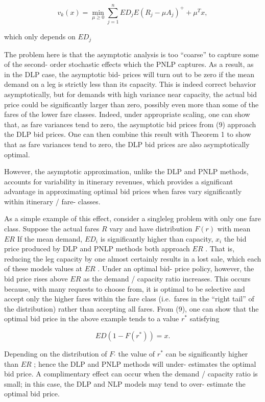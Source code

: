 \[
v_{k}(x) = \min_{\mu \geq 0}\sum_{j = 1}^{n}ED_{j}E(R_{j} - \mu A_{j})^{+} + \mu^{T}x,
\]

which only depends on \(ED_{j}\)

The problem here is that the asymptotic analysis is too ``coarse'' to
capture some of the second- order stochastic effects which the PNLP
captures. As a result, as in the DLP case, the asymptotic bid- prices
will turn out to be zero if the mean demand on a leg is strictly less
than its capacity. This is indeed correct behavior asymptotically, but
for demands with high variance near capacity, the actual bid price could
be significantly larger than zero, possibly even more than some of the
fares of the lower fare classes. Indeed, under appropriate scaling, one
can show that, as fare variances tend to zero, the asymptotic bid prices
from (9) approach the DLP bid prices. One can then combine this result
with Theorem 1 to show that as fare variances tend to zero, the DLP bid
prices are also asymptotically optimal.

However, the asymptotic approximation, unlike the DLP and PNLP methods,
accounts for variability in itinerary revenues, which provides a
significant advantage in approximating optimal bid prices when fares
vary significantly within itinerary / fare- classes.

As a simple example of this effect, consider a singleleg problem with
only one fare class. Suppose the actual fares \(R\) vary and have
distribution \(F(r)\) with mean \(ER\) If the mean demand, \(ED_{i}\) is
significantly higher than capacity, \(x_{i}\) the bid price produced by
DLP and PNLP methods both approach \(ER\) . That is, reducing the leg
capacity by one almost certainly results in a lost sale, which each of
these models values at \(ER\) . Under an optimal bid- price policy,
however, the bid price rises above \(ER\) as the demand / capacity ratio
increases. This occurs because, with many requests to choose from, it is
optimal to be selective and accept only the higher fares within the fare
class (i.e.~fares in the ``right tail'' of the distribution) rather than
accepting all fares. From (9), one can show that the optimal bid price
in the above example tends to a value \(r^{*}\) satisfying

\[
ED(1 - F(r^{*})) = x.
\]

Depending on the distribution of \(F_{\prime}\) the value of \(r^{*}\)
can be significantly higher than \(ER\) ; hence the DLP and PNLP methods
will under- estimates the optimal bid price. A complimentary effect can
occur when the demand / capacity ratio is small; in this case, the DLP
and NLP models may tend to over- estimate the optimal bid price.




